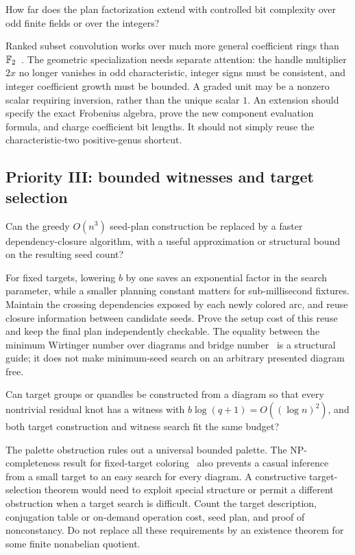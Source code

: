 \begin{question}
How far does the plan factorization extend with controlled bit complexity
over odd finite fields or over the integers?
\end{question}
Ranked subset convolution works over much more general coefficient rings
than $\mathbb F_2$~\cite{bhkk}. The geometric specialization needs separate
attention: the handle multiplier $2x$ no longer vanishes in odd
characteristic, integer signs must be consistent, and integer coefficient
growth must be bounded. A graded unit may be a nonzero scalar requiring
inversion, rather than the unique scalar $1$. An extension should specify
the exact Frobenius algebra, prove the new component evaluation formula,
and charge coefficient bit lengths. It should not simply reuse the
characteristic-two positive-genus shortcut.

\subsection{Priority III: bounded witnesses and target selection}

\begin{question}
Can the greedy $O(n^3)$ seed-plan construction be replaced by a faster
dependency-closure algorithm, with a useful approximation or structural
bound on the resulting seed count?
\end{question}
For fixed targets, lowering $b$ by one saves an exponential factor in
the search parameter, while a smaller planning constant matters for
sub-millisecond fixtures. Maintain the crossing dependencies exposed by
each newly colored arc, and reuse closure information between candidate
seeds. Prove the setup cost of this reuse and keep the final plan
independently checkable. The equality between the minimum Wirtinger
number over diagrams and bridge number~\cite{blair} is a structural
guide; it does not make minimum-seed search on an arbitrary presented
diagram free.

\begin{question}
Can target groups or quandles be constructed from a diagram so that
every nontrivial residual knot has a witness with
$b\log(q+1)=O((\log n)^2)$, and both target construction and witness
search fit the same budget?
\end{question}
The palette obstruction rules out a universal bounded palette. The
NP-completeness result for fixed-target coloring~\cite{kuperbergsamperton}
also prevents a casual inference from a small target to an easy search
for every diagram. A constructive target-selection theorem would need
to exploit special structure or permit a different obstruction when
a target search is difficult. Count the target description, conjugation
table or on-demand operation cost, seed plan, and proof of nonconstancy.
Do not replace all these requirements by an existence theorem for some
finite nonabelian quotient.

